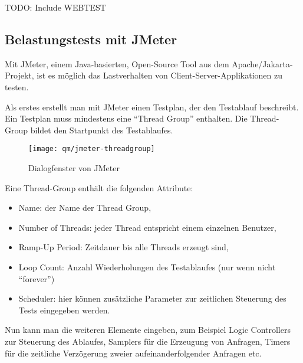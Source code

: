 %
%
\newpage
TODO: Include WEBTEST
\newpage

%
\subsection{Belastungstests mit JMeter}
Mit JMeter, einem Java-basierten, Open-Source Tool aus dem
Apache/Jakarta-Projekt,  ist es möglich das Lastverhalten von
Client-Server-Applikationen zu testen.

Als erstes erstellt man mit JMeter einen Testplan, der den Testablauf
beschreibt. Ein Testplan muss mindestens eine ``Thread Group'' enthalten.
Die Thread-Group bildet den Startpunkt des Testablaufes.
\begin{figure}[H]
\centering
\texttt{[image: qm/jmeter-threadgroup]}
\caption{Dialogfenster von JMeter}
\end{figure}
\newslide
Eine Thread-Group enthält die folgenden Attribute:
\begin{itemize}
\item Name: der Name der Thread Group,
\item Number of Threads: jeder Thread entspricht einem einzelnen
  Benutzer,%
\item Ramp-Up Period: Zeitdauer bis alle Threads erzeugt sind,
\item Loop Count: Anzahl Wiederholungen des Testablaufes (nur wenn nicht
  ``forever'')
\item Scheduler: hier können zusätzliche Parameter zur zeitlichen Steuerung des
  Tests eingegeben werden.
\end{itemize}
Nun kann man die weiteren Elemente eingeben, zum Beispiel Logic Controllers zur
Steuerung des Ablaufes, Samplers für die Erzeugung von Anfragen, Timers für
die zeitliche Verzögerung zweier aufeinanderfolgender Anfragen etc.

